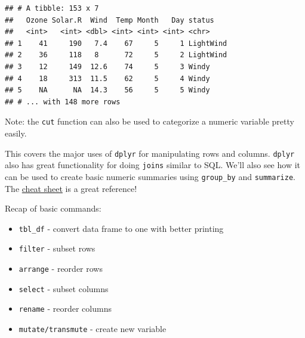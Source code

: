 \documentclass[
]{book}
\newenvironment{Shaded}{\begin{snugshade}}{\end{snugshade}}
\newcommand{\DataTypeTok}[1]{\textcolor[rgb]{0.13,0.29,0.53}{#1}}
\newcommand{\DecValTok}[1]{\textcolor[rgb]{0.00,0.00,0.81}{#1}}
\newcommand{\KeywordTok}[1]{\textcolor[rgb]{0.13,0.29,0.53}{\textbf{#1}}}
\newcommand{\NormalTok}[1]{#1}
\newcommand{\OperatorTok}[1]{\textcolor[rgb]{0.81,0.36,0.00}{\textbf{#1}}}
\newcommand{\StringTok}[1]{\textcolor[rgb]{0.31,0.60,0.02}{#1}}
\providecommand{\tightlist}{%
  \setlength{\itemsep}{0pt}\setlength{\parskip}{0pt}}
\theoremstyle{definition}
\theoremstyle{definition}
\theoremstyle{definition}
\theoremstyle{remark}
\begin{document}
\begin{Shaded}
\end{Shaded}

\begin{verbatim}
## # A tibble: 153 x 7
##   Ozone Solar.R  Wind  Temp Month   Day status   
##   <int>   <int> <dbl> <int> <int> <int> <chr>    
## 1    41     190   7.4    67     5     1 LightWind
## 2    36     118   8      72     5     2 LightWind
## 3    12     149  12.6    74     5     3 Windy    
## 4    18     313  11.5    62     5     4 Windy    
## 5    NA      NA  14.3    56     5     5 Windy    
## # ... with 148 more rows
\end{verbatim}

Note: the \texttt{cut} function can also be used to categorize a numeric variable pretty easily.

This covers the major uses of \texttt{dplyr} for manipulating rows and columns. \texttt{dplyr} also has great functionality for doing \texttt{joins} similar to SQL. We'll also see how it can be used to create basic numeric summaries using \texttt{group\_by} and \texttt{summarize}. The \href{https://www.rstudio.com/wp-content/uploads/2015/02/data-wrangling-cheatsheet.pdf}{cheat sheet} is a great reference!

Recap of basic commands:

\begin{itemize}
\tightlist
\item
  \texttt{tbl\_df} - convert data frame to one with better printing\\
\item
  \texttt{filter} - subset rows\\
\item
  \texttt{arrange} - reorder rows\\
\item
  \texttt{select} - subset columns\\
\item
  \texttt{rename} - reorder columns\\
\item
  \texttt{mutate/transmute} - create new variable
\end{itemize}
\end{document}
